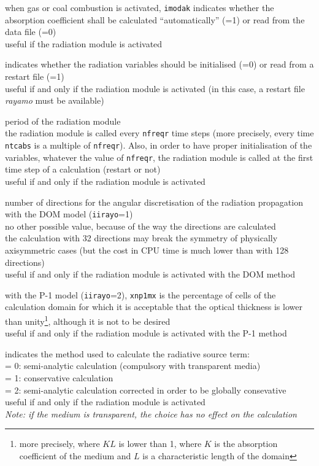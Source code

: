 {when gas or coal combustion is activated, {\tt imodak} indicates whether the
absorption coefficient shall be calculated ``automatically'' (=1) or read from
the data file (=0)\\
useful if the radiation module is activated}

{indicates whether the radiation variables should be initialised (=0) or read
from a restart file (=1)\\
useful if and only if the radiation module is activated (in this case, a
restart file {\em rayamo} must be available)}

{period of the radiation module\\
the radiation module is called every {\tt nfreqr} time steps (more precisely,
every time {\tt ntcabs} is a multiple of {\tt nfreqr}). Also, in order to
have proper initialisation of the variables, whatever the value of {\tt nfreqr},
the radiation module is called at the first time step of a calculation
(restart or not)\\
useful if and only if the radiation module is activated}

{number of directions for the angular discretisation of the radiation
propagation with the DOM model ({\tt iirayo}=1)\\
no other possible value, because of the way the directions are calculated\\
the calculation with 32 directions may break the symmetry of
physically axisymmetric cases (but the cost in CPU time is much lower
 than with 128 directions)\\
useful if and only if the radiation module is activated with the DOM method}

{with the P-1 model ({\tt iirayo}=2), {\tt xnp1mx} is the percentage of cells of
the calculation domain for which it is acceptable that the optical
thickness is lower than unity\footnote{more precisely, where $KL$ is lower than
1, where $K$ is the absorption coefficient of the medium and $L$ is a
characteristic length of the domain}, although it is not to be desired\\
useful if and only if the radiation module is activated with the P-1 method}

{indicates the method used to calculate the radiative source term:\\
\hspace*{1.3cm}= 0: semi-analytic calculation (compulsory with transparent
media)\\
\hspace*{1.3cm}= 1: conservative calculation\\
\hspace*{1.3cm}= 2: semi-analytic calculation corrected in order to be
globally consevative\\
useful if and only if the radiation module is activated\\
{\em Note: if the medium is transparent, the choice has no effect on the calculation}}

